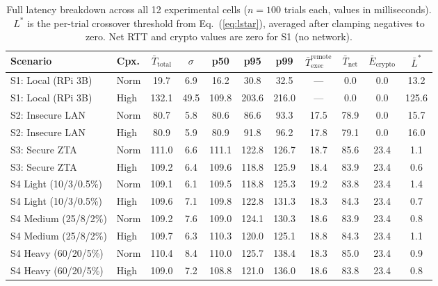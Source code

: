 \documentclass[10pt,twocolumn]{article}
\begin{document}
\begin{table}[t]
\centering
\caption{Full latency breakdown across all 12 experimental cells
($n=100$ trials each, values in milliseconds).  $L^*$ is the per-trial
crossover threshold from Eq.~(\ref{eq:lstar}), averaged after clamping
negatives to zero.  Net RTT and crypto values are zero for S1 (no network).}
\label{tab:results}
\setlength{\tabcolsep}{4.5pt}
\begin{tabular}{llccccccccc}
\toprule
\textbf{Scenario} & \textbf{Cpx.}
    & $\bar{T}_{\text{total}}$
    & $\sigma$
    & p50
    & p95
    & p99
    & $\bar{T}_{\text{exec}}^{\text{remote}}$
    & $\bar{T}_{\text{net}}$
    & $\bar{E}_{\text{crypto}}$
    & $\bar{L}^*$ \\
\midrule
S1: Local (RPi 3B)        & Norm  & 19.7  & 6.9  & 16.2  & 30.8  & 32.5  & ---  & 0.0  & 0.0   & 13.2  \\
S1: Local (RPi 3B)        & High  & 132.1 & 49.5 & 109.8 & 203.6 & 216.0 & ---  & 0.0  & 0.0   & 125.6 \\
\midrule
S2: Insecure LAN          & Norm  & 80.7  & 5.8  & 80.6  & 86.6  & 93.3  & 17.5 & 78.9 & 0.0   & 15.7  \\
S2: Insecure LAN          & High  & 80.9  & 5.9  & 80.9  & 91.8  & 96.2  & 17.8 & 79.1 & 0.0   & 16.0  \\
\midrule
S3: Secure ZTA            & Norm  & 111.0 & 6.6  & 111.1 & 122.8 & 126.7 & 18.7 & 85.6 & 23.4  & 1.1   \\
S3: Secure ZTA            & High  & 109.2 & 6.4  & 109.6 & 118.8 & 125.9 & 18.4 & 83.9 & 23.4  & 0.6   \\
\midrule
S4 Light  (10/3/0.5\%)   & Norm  & 109.1 & 6.1  & 109.5 & 118.8 & 125.3 & 19.2 & 83.8 & 23.4  & 1.4   \\
S4 Light  (10/3/0.5\%)   & High  & 109.6 & 7.1  & 109.8 & 122.8 & 131.3 & 18.3 & 84.3 & 23.4  & 0.7   \\
S4 Medium (25/8/2\%)     & Norm  & 109.2 & 7.6  & 109.0 & 124.1 & 130.3 & 18.6 & 83.9 & 23.4  & 0.8   \\
S4 Medium (25/8/2\%)     & High  & 109.7 & 6.3  & 110.3 & 120.0 & 125.1 & 18.8 & 84.3 & 23.4  & 1.1   \\
S4 Heavy  (60/20/5\%)    & Norm  & 110.4 & 8.4  & 110.0 & 125.7 & 138.4 & 18.3 & 85.0 & 23.4  & 0.9   \\
S4 Heavy  (60/20/5\%)    & High  & 109.0 & 7.2  & 108.8 & 121.0 & 136.0 & 18.6 & 83.8 & 23.4  & 0.8   \\
\bottomrule
\end{tabular}
\end{table}
\end{document}
